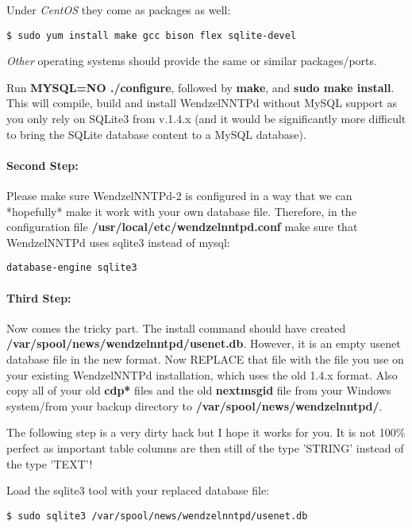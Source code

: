 Under {\it CentOS} they come as packages as well:
\begin{verbatim}
$ sudo yum install make gcc bison flex sqlite-devel
\end{verbatim}

{\it Other} operating systems should provide the same or similar packages/ports.

Run {\bf MYSQL=NO ./configure}, followed by {\bf make}, and {\bf sudo make install}. This will compile, build and install WendzelNNTPd without MySQL support as you only rely on SQLite3 from v.1.4.x (and it would be significantly more difficult to bring the SQLite database content to a MySQL database).

\paragraph*{Second Step:} Please make sure WendzelNNTPd-2 is configured in a way that we can *hopefully* make it work with your own database file. Therefore, in the configuration file {\bf /usr/local/etc/wendzelnntpd.conf} make sure that WendzelNNTPd uses sqlite3 instead of mysql:

\begin{verbatim}
database-engine sqlite3
\end{verbatim}

\paragraph*{Third Step:}
Now comes the tricky part. The install command should have created
{\bf /var/spool/news/wendzelnntpd/usenet.db}.
However, it is an empty usenet database file in the new format.
Now REPLACE that file with the file you use on your existing WendzelNNTPd installation, which uses the old 1.4.x format. Also copy all of your old {\bf cdp*} files and the old {\bf nextmsgid} file from your Windows system/from your backup directory to {\bf /var/spool/news/wendzelnntpd/}. 

The following step is a very dirty hack but I hope it works for you. It is not 100\% perfect as important table columns are then still of the type 'STRING' instead of the type 'TEXT'!

Load the sqlite3 tool with your replaced database file:

\begin{verbatim}
$ sudo sqlite3 /var/spool/news/wendzelnntpd/usenet.db
\end{verbatim}

